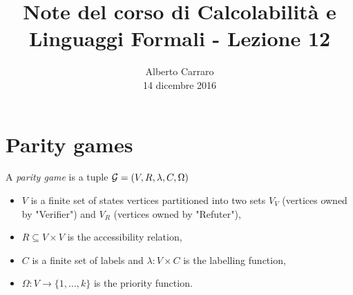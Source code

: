 \documentclass[runningheads,a4paper]{llncs}
\begin{document}
\mainmatter  %

\title{Note del corso di Calcolabilit\`{a} e Linguaggi Formali - Lezione 12}


%
%
\author{Alberto Carraro \\ 14 dicembre 2016}
%


%
%




\maketitle


\section{Parity games}

\begin{definition}\label{def:parity-game}
A \emph{parity game} is a tuple $\mathcal{G} = (V, R, \lambda, C, \Omega)$
\begin{itemize}
\item $V$ is a finite set of states vertices partitioned into two sets $V_V$ (vertices owned by "Verifier") and $V_R$ (vertices owned by "Refuter"),
\item $R \subseteq V \times V$ is the accessibility relation,
\item $C$ is a finite set of labels and $\lambda: V \times C$ is the labelling function,
\item $\Omega: V \to \{1,\ldots, k\}$ is the priority function.
\end{itemize}
\end{definition}
\end{document}
